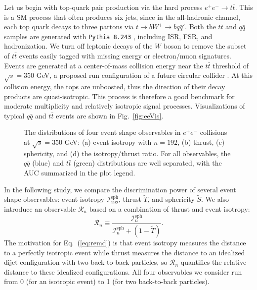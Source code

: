 \documentclass[letterpaper,11pt]{article}
\newcommand{\be}{\begin{equation}}
\newcommand{\ee}{\end{equation}}
\newcommand{\iso}[2]{\mathcal{I}^\text{#1}_{#2}}
\newcommand{\remd}{\mathcal{R}_n}
\DeclareRobustCommand{\Fig}[1]{Fig.~\ref{#1}}
\DeclareRobustCommand{\Eq}[1]{Eq.~(\ref{#1})}
\begin{document}
Let us begin with top-quark pair production via the hard process $e^+e^- \rightarrow t \bar{t}$.
%
This is a SM process that often produces six jets, since in the all-hadronic channel, each top quark decays to three partons via $t\rightarrow b W^+ \rightarrow b q \bar{q}'$. 
%
Both the $t\bar{t}$ and $q\bar{q}$ samples are generated with \texttt{Pythia 8.243} \cite{Sjostrand:2014zea}, including ISR, FSR, and hadronization. 
%
We turn off leptonic decays of the $W$ boson to remove the subset of $t\bar{t}$ events easily tagged with missing energy or electron/muon signatures. 
%
Events are generated at a center-of-mass collision energy near the $t\bar{t}$ threshold of $\sqrt{s} = 350$ GeV, a proposed run configuration of a future circular collider \cite{Abada:2019zxq}. 
%
At this collision energy, the tops are unboosted, thus the direction of their decay products are quasi-isotropic. 
%
This process is therefore a good benchmark for moderate multiplicity and relatively isotropic signal processes.
%
Visualizations of typical $q\bar{q}$ and $t\bar{t}$ events are shown in \Fig{fig:eeVis}.


\begin{figure}[t!]
%
     \hfill
     \hfill
     \hfill
\caption{The distributions of four event shape observables in $e^+e^-$ collisions at $\sqrt{s} = 350$ GeV:  (a) event isotropy with $n = 192$, (b) thrust, (c) sphericity, and (d) the isotropy/thrust ratio. 
%
For all observables, the $q\bar{q}$ (blue) and $t\bar{t}$ (green) distributions are well separated, with the AUC summarized in the plot legend.}
%
\label{fig:eeSpec}
\end{figure}



In the following study, we compare the discrimination power of several event shape observables:  event isotropy $\iso{sph}{192}$, thrust $\widetilde{T}$, and sphericity $\widetilde{S}$.
%
We also introduce an observable $\remd$ based on a combination of thrust and event isotropy:
%
\be
%
\label{eq:remd}
%
\remd \equiv \frac{\iso{sph}{n}}{\iso{sph}{n} + (1-\widetilde{T})}.
%
\ee
%
The motivation for \Eq{eq:remd} is that event isotropy measures the distance to a perfectly isotropic event while thrust measures the distance to an idealized dijet configuration with two back-to-back particles, so $\remd$ quantifies the relative distance to these idealized configurations. 
%
All four observables we consider run from 0 (for an isotropic event) to 1 (for two back-to-back particles).
\end{document}

